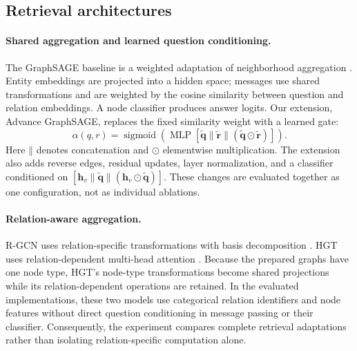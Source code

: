 \documentclass[10pt]{article}
\newcommand{\concat}{\mathbin{\|}}
\newcommand{\method}{Advance GraphSAGE}
\begin{document}
\subsection{Retrieval architectures}
\label{sec:architectures}

\paragraph{Shared aggregation and learned question conditioning.}
The GraphSAGE baseline is a weighted adaptation of neighborhood aggregation \citep{hamilton2017graphsage}. Entity embeddings are projected into a hidden space; messages use shared transformations and are weighted by the cosine similarity between question and relation embeddings. A node classifier produces answer logits. Our extension, \method{}, replaces the fixed similarity weight with a learned gate:
\begin{equation}
 \alpha(q,r)=\operatorname{sigmoid}\!\left(\operatorname{MLP}
 [\widetilde{\mathbf q}\concat\widetilde{\mathbf r}\concat
 (\widetilde{\mathbf q}\odot\widetilde{\mathbf r})]\right).
 \label{eq:gate}
\end{equation}
Here $\concat$ denotes concatenation and $\odot$ elementwise multiplication. The extension also adds reverse edges, residual updates, layer normalization, and a classifier conditioned on $[\mathbf h_v\concat\widetilde{\mathbf q}\concat(\mathbf h_v\odot\widetilde{\mathbf q})]$. These changes are evaluated together as one configuration, not as individual ablations.

\paragraph{Relation-aware aggregation.}
R-GCN uses relation-specific transformations with basis decomposition \citep{schlichtkrull2018rgcn}. HGT uses relation-dependent multi-head attention \citep{hu2020hgt}. Because the prepared graphs have one node type, HGT's node-type transformations become shared projections while its relation-dependent operations are retained. In the evaluated implementations, these two models use categorical relation identifiers and node features without direct question conditioning in message passing or their classifier. Consequently, the experiment compares complete retrieval adaptations rather than isolating relation-specific computation alone.
\end{document}

